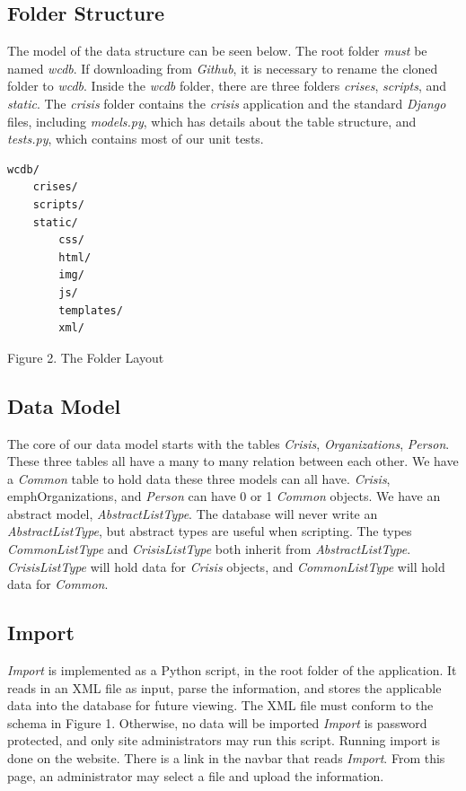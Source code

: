 \documentclass[12pt]{report}
\begin{document}
\subsection*{Folder Structure}
The model of the data structure can be seen below.
The root folder \emph{must} be named \emph{wcdb}.
If downloading from \emph{Github}, it is necessary to rename the cloned folder to \emph{wcdb}.
Inside the \emph{wcdb} folder, there are three folders \emph{crises}, \emph{scripts}, and \emph{static}.
The \emph{crisis} folder contains the \emph{crisis} application and the standard \emph{Django} files,
including \emph{models.py}, which has details about the table structure, and \emph{tests.py}, which contains
most of our unit tests.

\hfill \newline
{}
\begin{lstlisting}
wcdb/
    crises/
    scripts/
    static/
        css/
        html/
        img/
        js/
        templates/
        xml/
\end{lstlisting}

\footnotesize Figure 2. The Folder Layout \normalsize

\subsection*{Data Model}
The core of our data model starts with the tables \emph{Crisis}, \emph{Organizations}, \emph{Person}.
These three tables all have a many to many relation between each other.
We have a \emph{Common} table to hold data these three models can all have.
\emph{Crisis}, emph{Organizations}, and \emph{Person} can have 0 or 1 \emph{Common} objects.
We have an abstract model, \emph{AbstractListType}.
The database will never write an \emph{AbstractListType}, but abstract types are useful when scripting.
The types \emph{CommonListType} and \emph{CrisisListType} both inherit from \emph{AbstractListType}.
\emph{CrisisListType} will hold data for \emph{Crisis} objects, and \emph{CommonListType} will hold data for \emph{Common}.

\subsection*{Import}
\emph{Import} is implemented as a Python script, in the root folder of the application.
It reads in an XML file as input, parse the information, and stores the applicable data into the database for future viewing.
The XML file must conform to the schema in Figure 1.
Otherwise, no data will be imported
\emph{Import} is password protected, and only site administrators may run this script.
Running import is done on the website.
There is a link in the navbar that reads \emph{Import}.
From this page, an administrator may select a file and upload the information.
\end{document}
